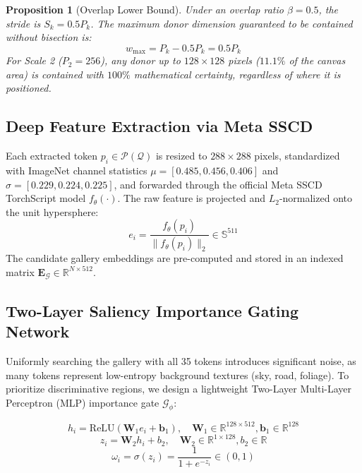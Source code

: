 \documentclass[journal]{IEEEtran}
\newtheorem{proposition}{Proposition}
\begin{document}
\begin{proposition}[Overlap Lower Bound]
Under an overlap ratio $\beta = 0.5$, the stride is $S_k = 0.5 P_k$. The maximum donor dimension guaranteed to be contained without bisection is:
\begin{equation}
w_{\max} = P_k - 0.5 P_k = 0.5 P_k
\end{equation}
For Scale 2 ($P_2 = 256$), any donor up to $128 \times 128$ pixels ($11.1\%$ of the canvas area) is contained with $100\%$ mathematical certainty, regardless of where it is positioned.
\end{proposition}

\subsection{Deep Feature Extraction via Meta SSCD}
Each extracted token $p_i \in \mathcal{P}(\mathcal{Q})$ is resized to $288 \times 288$ pixels, standardized with ImageNet channel statistics $\mu = [0.485, 0.456, 0.406]$ and $\sigma = [0.229, 0.224, 0.225]$, and forwarded through the official Meta SSCD TorchScript model $f_\theta(\cdot)$. The raw feature is projected and $L_2$-normalized onto the unit hypersphere:
\begin{equation}
e_i = \frac{f_\theta(p_i)}{\|f_\theta(p_i)\|_2} \in \mathbb{S}^{511}
\end{equation}
The candidate gallery embeddings are pre-computed and stored in an indexed matrix $\mathbf{E}_{\mathcal{G}} \in \mathbb{R}^{N \times 512}$.

\subsection{Two-Layer Saliency Importance Gating Network}
Uniformly searching the gallery with all 35 tokens introduces significant noise, as many tokens represent low-entropy background textures (sky, road, foliage). To prioritize discriminative regions, we design a lightweight Two-Layer Multi-Layer Perceptron (MLP) importance gate $\mathcal{G}_\phi$:

\begin{equation}
h_i = \text{ReLU}(\mathbf{W}_1 e_i + \mathbf{b}_1), \quad \mathbf{W}_1 \in \mathbb{R}^{128 \times 512}, \mathbf{b}_1 \in \mathbb{R}^{128}
\end{equation}
\begin{equation}
z_i = \mathbf{W}_2 h_i + b_2, \quad \mathbf{W}_2 \in \mathbb{R}^{1 \times 128}, b_2 \in \mathbb{R}
\end{equation}
\begin{equation}
\omega_i = \sigma(z_i) = \frac{1}{1 + e^{-z_i}} \in (0, 1)
\end{equation}
\end{document}
